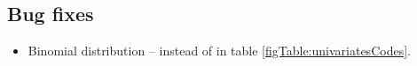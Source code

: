 \subsection{Bug fixes}
\begin{itemize}
\item 
Binomial distribution --  instead of 
in table \ref{figTable:univariatesCodes}.
\end{itemize}

%
%



        
